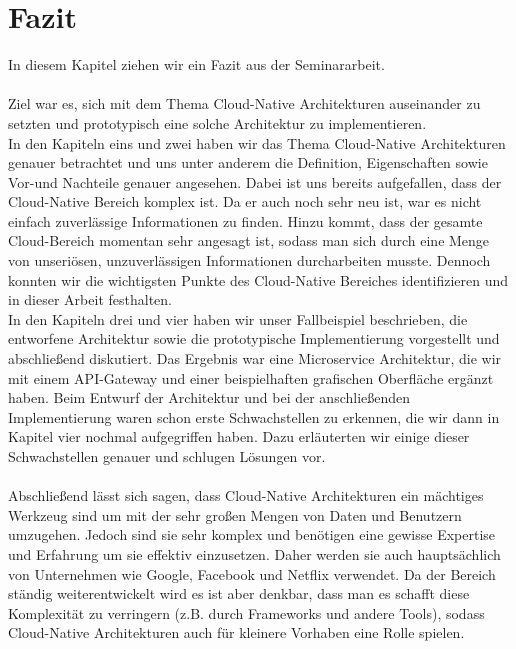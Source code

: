 \chapter{Fazit}
In diesem Kapitel ziehen wir ein Fazit aus der Seminararbeit.\\
\\
Ziel war es, sich mit dem Thema Cloud-Native Architekturen auseinander zu setzten und prototypisch eine solche Architektur zu implementieren.\\
In den Kapiteln eins und zwei haben wir das Thema Cloud-Native Architekturen genauer betrachtet und uns unter anderem die Definition, Eigenschaften sowie Vor-und Nachteile genauer angesehen. Dabei ist uns bereits aufgefallen, dass der Cloud-Native Bereich komplex ist. Da er auch noch sehr neu ist, war es nicht einfach zuverlässige Informationen zu finden. Hinzu kommt, dass der gesamte Cloud-Bereich momentan sehr angesagt ist, sodass man sich durch eine Menge von unseriösen, unzuverlässigen Informationen durcharbeiten musste. Dennoch konnten wir die wichtigsten Punkte des Cloud-Native Bereiches identifizieren und in dieser Arbeit festhalten.\\
In den Kapiteln drei und vier haben wir unser Fallbeispiel beschrieben, die entworfene Architektur sowie die prototypische Implementierung vorgestellt und abschließend diskutiert. Das Ergebnis war eine Microservice Architektur, die wir mit einem API-Gateway und einer beispielhaften grafischen Oberfläche ergänzt haben. Beim Entwurf der Architektur und bei der anschließenden Implementierung waren schon erste Schwachstellen zu erkennen, die wir dann in Kapitel vier nochmal aufgegriffen haben. Dazu erläuterten wir einige dieser Schwachstellen genauer und schlugen Lösungen vor.\\
\\
Abschließend lässt sich sagen, dass Cloud-Native Architekturen ein mächtiges Werkzeug sind um mit der sehr großen Mengen von Daten und Benutzern umzugehen. Jedoch sind sie sehr komplex und benötigen eine gewisse Expertise und Erfahrung um sie effektiv einzusetzen. Daher werden sie auch hauptsächlich von Unternehmen wie Google, Facebook und Netflix verwendet. Da der Bereich ständig weiterentwickelt wird es ist aber denkbar, dass man es schafft diese Komplexität zu verringern (z.B. durch Frameworks und andere Tools), sodass Cloud-Native Architekturen auch für kleinere Vorhaben eine Rolle spielen.



